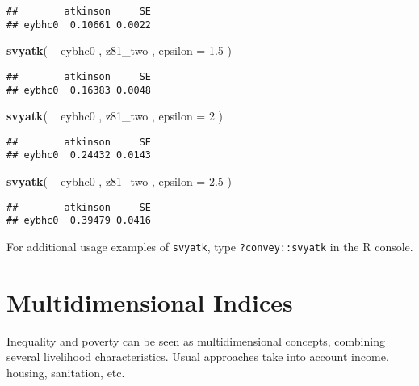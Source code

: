 \documentclass[]{book}
\newenvironment{Shaded}{\begin{snugshade}}{\end{snugshade}}
\newcommand{\KeywordTok}[1]{\textcolor[rgb]{0.13,0.29,0.53}{\textbf{{#1}}}}
\newcommand{\DataTypeTok}[1]{\textcolor[rgb]{0.13,0.29,0.53}{{#1}}}
\newcommand{\DecValTok}[1]{\textcolor[rgb]{0.00,0.00,0.81}{{#1}}}
\newcommand{\FloatTok}[1]{\textcolor[rgb]{0.00,0.00,0.81}{{#1}}}
\newcommand{\StringTok}[1]{\textcolor[rgb]{0.31,0.60,0.02}{{#1}}}
\newcommand{\NormalTok}[1]{{#1}}
\begin{document}
\begin{verbatim}
##        atkinson     SE
## eybhc0  0.10661 0.0022
\end{verbatim}

\begin{Shaded}
\begin{Highlighting}[]
\KeywordTok{svyatk}\NormalTok{( ~}\StringTok{ }\NormalTok{eybhc0 , z81_two , }\DataTypeTok{epsilon =} \FloatTok{1.5} \NormalTok{)}
\end{Highlighting}
\end{Shaded}

\begin{verbatim}
##        atkinson     SE
## eybhc0  0.16383 0.0048
\end{verbatim}

\begin{Shaded}
\begin{Highlighting}[]
\KeywordTok{svyatk}\NormalTok{( ~}\StringTok{ }\NormalTok{eybhc0 , z81_two , }\DataTypeTok{epsilon =} \DecValTok{2} \NormalTok{)}
\end{Highlighting}
\end{Shaded}

\begin{verbatim}
##        atkinson     SE
## eybhc0  0.24432 0.0143
\end{verbatim}

\begin{Shaded}
\begin{Highlighting}[]
\KeywordTok{svyatk}\NormalTok{( ~}\StringTok{ }\NormalTok{eybhc0 , z81_two , }\DataTypeTok{epsilon =} \FloatTok{2.5} \NormalTok{)}
\end{Highlighting}
\end{Shaded}

\begin{verbatim}
##        atkinson     SE
## eybhc0  0.39479 0.0416
\end{verbatim}

For additional usage examples of \texttt{svyatk}, type
\texttt{?convey::svyatk} in the R console.

\chapter{Multidimensional Indices}\label{multidimensional}

Inequality and poverty can be seen as multidimensional concepts,
combining several livelihood characteristics. Usual approaches take into
account income, housing, sanitation, etc.
\end{document}
